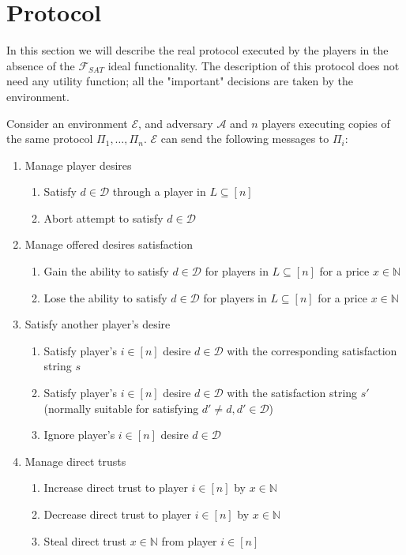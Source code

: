 \section{Protocol}
  In this section we will describe the real protocol executed by the players in the
  absence of the $\mathcal{F}_{SAT}$ ideal functionality. The description of this protocol
  does not need any utility function; all the "important" decisions are taken by the
  environment.

  Consider an environment $\mathcal{E}$, and adversary $\mathcal{A}$ and $n$ players
  executing copies of the same protocol $\Pi_1, \dots, \Pi_n$. $\mathcal{E}$ can send the
  following messages to $\Pi_i$:
  \begin{enumerate}
    \item \label{msg:env:desires} Manage player desires
    \begin{enumerate}
      \item \label{msg:env:desires:create} Satisfy $d \in \mathcal{D}$ through a player in
      $L \subseteq \left[n\right]$
      \item \label{msg:env:desires:abort} Abort attempt to satisfy $d \in \mathcal{D}$
    \end{enumerate}
    \item Manage offered desires satisfaction
    \begin{enumerate}
      \item Gain the ability to satisfy $d \in \mathcal{D}$ for players in $L \subseteq
      \left[n\right]$ for a price $x \in \mathbb{N}$
      \item Lose the ability to satisfy $d \in \mathcal{D}$ for players in $L \subseteq
      \left[n\right]$ for a price $x \in \mathbb{N}$
    \end{enumerate}
    \item Satisfy another player's desire
    \begin{enumerate}
      \item Satisfy player's $i \in \left[n\right]$ desire $d \in \mathcal{D}$ with the
      corresponding satisfaction string $s$
      \item Satisfy player's $i \in \left[n\right]$ desire $d \in \mathcal{D}$ with the
      satisfaction string $s'$ (normally suitable for satisfying $d' \neq d, d' \in
      \mathcal{D}$)
      \item Ignore player's $i \in \left[n\right]$ desire $d \in \mathcal{D}$
    \end{enumerate}
    \item Manage direct trusts
    \begin{enumerate}
      \item Increase direct trust to player $i \in \left[n\right]$ by $x \in \mathbb{N}$
      \item Decrease direct trust to player $i \in \left[n\right]$ by $x \in \mathbb{N}$
      \item Steal direct trust $x \in \mathbb{N}$ from player $i \in \left[n\right]$
    \end{enumerate}
  \end{enumerate}
